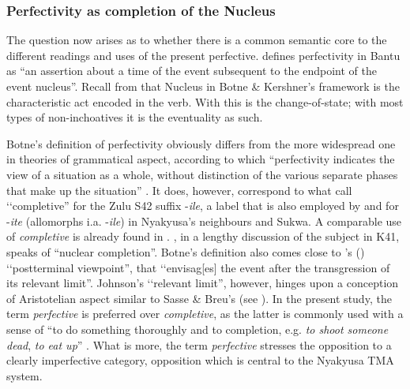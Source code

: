 \subsubsection{Perfectivity as completion of the Nucleus}\label{PerfectivityCompletion}
The question now arises as to whether there is a common semantic core to the different readings and uses of the present perfective. \citet[43]{BotneR2010b} defines perfectivity in Bantu as ``an assertion about a time of the event subsequent to the endpoint of the event nucleus''. Recall from  that Nucleus in Botne \& Kershner's framework is the characteristic act encoded in the verb. With  this is the change-of-state; with most types of non-inchoatives it is the eventuality as such.



Botne's definition of perfectivity obviously differs from the more widespread one in theories of grammatical aspect, according to which ``perfectivity indicates the view of a situation as a whole, without distinction of the various separate phases that make up the situation'' \citep[16]{ComrieB1976}. It does, however, correspond to what \citet{BotneRKershnerT2000} call \lq\lq completive'' for the Zulu S42 suffix \mbox{-\textit{ile}}, a label that is also employed by \citet{BotneR2008} and \citet{KershnerT2002} for \mbox{-\textit{ite}} (allomorphs i.a. \mbox{-\textit{ile}}) in Nyakyusa's neighbours  and Sukwa. A comparable use of \textit{completive} is already found in \citet{WelmersW1974}. \citet[118--142]{CraneTM2011}, in a lengthy discussion of the subject in  K41, speaks of ``nuclear completion''. Botne's definition also comes close to \citeauthor{JohansonL2000}'s (\citeyear[29]{JohansonL2000}) \lq\lq postterminal viewpoint'', that \lq\lq envisag[es] the event after the transgression of its relevant limit''. Johnson's \lq\lq relevant limit'', however, hinges upon a conception of Aristotelian aspect similar to Sasse \& Breu's (see ). In the present study, the term \textit{perfective} is preferred over \textit{completive}, as the latter is commonly used with a sense of ``to do something thoroughly and to completion, e.g. \textit{to shoot someone dead}, \textit{to eat up}'' \citep[318]{BybeePerkinsPaglucia1994}. What is more, the term \textit{perfective} stresses the opposition to a clearly imperfective category, opposition which is central to the Nyakyusa TMA system.

